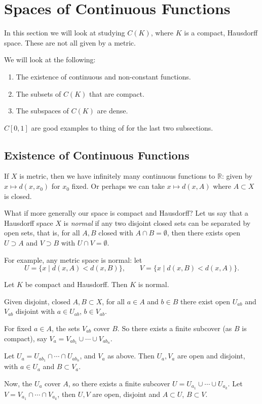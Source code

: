 \documentclass[12pt]{article}
\begin{document}
\newpage

\section{Spaces of Continuous Functions}
\label{sec:spaces_of_cont_funs}

In this section we will look at studying $C(K)$, where $K$ is a compact, Hausdorff space. These are not all given by a metric.

We will look at the following:
\begin{enumerate}
	\item The existence of continuous and non-constant functions.
	\item The subsets of $C(K)$ that are compact.
	\item The subspaces of $C(K)$ are dense.
\end{enumerate}

$C[0,1]$ are good examples to thing of for the last two subsections.


\subsection{Existence of Continuous Functions}
\label{sub:cont_exists}

If $X$ is metric, then we have infinitely many continuous functions to $\mathbb{R}$: given by $x \mapsto d(x, x_0)$ for $x_0$ fixed. Or perhaps we can take $x \mapsto d(x, A)$ where $A \subset X$ is closed.

What if more generally our space is compact and Hausdorff? Let us say that a Hausdorff space $X$ is \emph{normal} if any two disjoint closed sets can be separated by open sets, that is, for all $A, B$ closed with $A \cap B = \emptyset$, then there exists open $U \supset A$ and $V \supset B$ with $U \cap V = \emptyset$.

For example, any metric space is normal: let
\[
	U = \{x \mid d(x, A) < d(x, B)\}, \qquad V = \{x \mid d(x, B) < d(x, A)\}.
\]

\begin{proposition}
	Let $K$ be compact and Hausdorff. Then $K$ is normal.
\end{proposition}

\begin{proofbox}
	Given disjoint, closed $A, B \subset X$, for all $a \in A$ and $b \in B$ there exist open $U_{ab}$ and $V_{ab}$ disjoint with $a \in U_{ab}$, $b \in V_{ab}$.

	For fixed $a \in A$, the sets $V_{ab}$ cover $B$. So there exists a finite subcover (as $B$ is compact), say $V_a = V_{ab_1} \cup \cdots \cup V_{ab_n}$.

	Let $U_a = U_{ab_1} \cap \cdots \cap U_{ab_n}$, and $V_a$ as above. Then $U_a, V_a$ are open and disjoint, with $a \in U_a$ and $B \subset V_a$.

	Now, the $U_a$ cover $A$, so there exists a finite subcover $U = U_{a_1} \cup \cdots \cup U_{a_k}$. Let $V = V_{a_1} \cap \cdots \cap V_{a_k}$, then $U, V$ are open, disjoint and $A \subset U$, $B \subset V$.
\end{proofbox}
\end{document}
